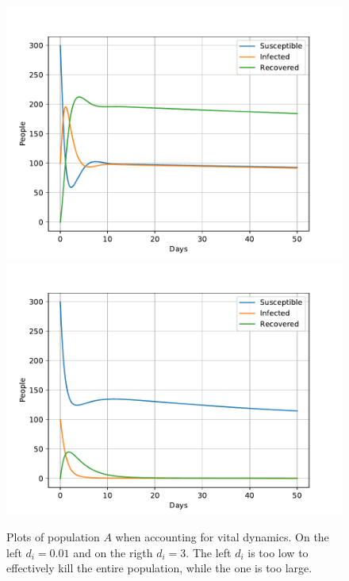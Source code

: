 \documentclass[a4paper]{article}
\begin{document}
\begin{figure}[!htb]
	\centering 
	\includegraphics[scale=0.56]{../plots/opp_c_k3.pdf} %
	\includegraphics[scale=0.56]{../plots/opp_c_k0.pdf}
	\caption{Plots of population $A$ when accounting for vital dynamics. On the left $d_i=0.01$ and on the rigth $d_i=3$. The left $d_i$ is too low to effectively kill the entire population, while the one is too large.}

\end{figure}
\end{document}
